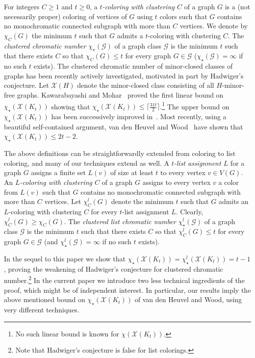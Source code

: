 \documentclass[12pt]{article}
\newcommand{\mc}[1]{\mathcal{#1}}
\begin{document}
For integers $C\ge 1$ and $t\ge 0$, a \emph{$t$-coloring with clustering $C$} of a graph $G$ is a (not necessarily proper) coloring of vertices of $G$ using $t$ colors
such that $G$ contains no monochromatic connected subgraph with more than $C$ vertices. We denote by $\chi_C(G)$ the minimum $t$ such that $G$ admits a $t$-coloring with clustering $C$. The \emph{clustered chromatic number $\chi_\star(\mc{G})$} of a graph class $\mc{G}$ is the minimum $t$ such that there exists $C$ so that $\chi_C(G) \leq t$ for every graph $G \in \mc{G}$
($\chi_\star(\mc{G})=\infty$ if no such $t$ exists).
The clustered chromatic number of minor-closed classes of graphs has been recently actively investigated, motivated in part by Hadwiger's conjecture. 
Let $\mc{X}(H)$ denote the minor-closed class consisting of all $H$-minor-free graphs.  Kawarabayashi and Mohar~\cite{KawMoh07} proved the first linear bound on $\chi_\star(\mc{X}(K_{t}))$ showing that $\chi_\star(\mc{X}(K_{t})) \leq \lceil \frac{31t}{2} \rceil$.\footnote{No such linear bound is known for $\chi(\mc{X}(K_{t}))$.} The upper bound on $\chi_\star(\mc{X}(K_{t}))$ has been successively improved in~\cite{Wood10,EKKOS15,LiuOum15}. Most recently, using a beautiful self-contained argument, van den Heuvel and Wood~\cite{vdHW17} have shown that $\chi_\star(\mc{X}(K_{t})) \leq 2t-2$.  

The above definitions can be straightforwardly extended from coloring to list coloring, and many of our techniques extend as well. A \emph{$t$-list assignment $L$} for a graph $G$ assigns a finite set $L(v)$ of size at least $t$ to every vertex $v \in V(G)$. An \emph{$L$-coloring  with clustering $C$} of a graph $G$ assigns to every vertex $v$ a color from $L(v)$ such that $G$ contains no monochromatic connected subgraph with more than $C$ vertices. Let $\chi^l_C(G)$ denote the minimum $t$ such that $G$ admits an $L$-coloring  with clustering $C$ for every $t$-list assignment $L$.
Clearly, $\chi^l_C(G) \geq \chi_C(G)$. The \emph{clustered list chromatic number $\chi^l_\star(\mc{G})$} of a graph class $\mc{G}$ is the minimum $t$ such
that there exists $C$ so that $\chi^l_C(G) \leq t$ for every graph $G \in \mc{G}$ (and $\chi^l_\star(\mc{G})=\infty$ if no such $t$ exists).

In the sequel to this paper 
we show that $\chi_\star(\mc{X}(K_{t})) = \chi^l_\star(\mc{X}(K_{t})) = t-1$, proving the weakening of Hadwiger's conjecture for clustered chromatic number.\footnote{Note that Hadwiger's conjecture is false for list colorings.} In the current paper we introduce two less technical ingredients of the proof, which might be of independent interest. In particular, our results imply the above mentioned bound on $\chi_\star(\mc{X}(K_{t}))$ of van den Heuvel and Wood, using very different techniques.
\end{document}
